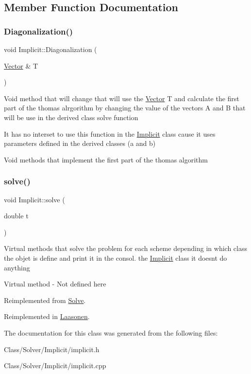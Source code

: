 \subsection{Member Function Documentation}
\mbox{\label{class_implicit_a572fff2232977c83c432f993f37a7853}} 
\subsubsection{\texorpdfstring{Diagonalization()}{Diagonalization()}}
{\footnotesize\ttfamily void Implicit\+::\+Diagonalization (\begin{DoxyParamCaption}\item[{\hyperlink{class_vector}{Vector} \&}]{T }\end{DoxyParamCaption})}

Void method that will change that will use the \hyperlink{class_vector}{Vector} T and calculate the first part of the thomas alrgorithm by changing the value of the vectors A and B that will be use in the derived class solve function

It has no interset to use this function in the \hyperlink{class_implicit}{Implicit} class cause it uses parameters defined in the derived classes (a and b)

Void methods that implement the first part of the thomas algorithm \mbox{\label{class_implicit_a027adb4276376991f75fcffbd34740b3}} 
\subsubsection{\texorpdfstring{solve()}{solve()}}
{\footnotesize\ttfamily void Implicit\+::solve (\begin{DoxyParamCaption}\item[{double}]{t }\end{DoxyParamCaption})\hspace{0.3cm}{\ttfamily [virtual]}}

Virtual methods that solve the problem for each scheme depending in which class the objet is define and print it in the consol.  the \hyperlink{class_implicit}{Implicit} class it doesn\textquotesingle{}t do anything

Virtual method -\/ Not defined here 

Reimplemented from \hyperlink{class_solve_a1a56722993fdabea9928637d7dd8a2c7}{Solve}.



Reimplemented in \hyperlink{class_laasonen_aaa49ab7d15fbfef94a57a0e89977d1c6}{Laasonen}.



The documentation for this class was generated from the following files\+:\begin{DoxyCompactItemize}
\item 
Class/\+Solver/\+Implicit/implicit.\+h\item 
Class/\+Solver/\+Implicit/implicit.\+cpp\end{DoxyCompactItemize}

